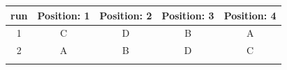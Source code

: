 \documentclass[]{book}
\theoremstyle{definition}
\theoremstyle{definition}
\theoremstyle{remark}
\begin{document}
\begin{longtable}[]{@{}ccccc@{}}
\toprule
\begin{minipage}[b]{0.07\columnwidth}\centering\strut
run\strut
\end{minipage} & \begin{minipage}[b]{0.17\columnwidth}\centering\strut
Position: 1\strut
\end{minipage} & \begin{minipage}[b]{0.17\columnwidth}\centering\strut
Position: 2\strut
\end{minipage} & \begin{minipage}[b]{0.17\columnwidth}\centering\strut
Position: 3\strut
\end{minipage} & \begin{minipage}[b]{0.17\columnwidth}\centering\strut
Position: 4\strut
\end{minipage}\tabularnewline
\midrule
\endhead
\begin{minipage}[t]{0.07\columnwidth}\centering\strut
1\strut
\end{minipage} & \begin{minipage}[t]{0.17\columnwidth}\centering\strut
C\strut
\end{minipage} & \begin{minipage}[t]{0.17\columnwidth}\centering\strut
D\strut
\end{minipage} & \begin{minipage}[t]{0.17\columnwidth}\centering\strut
B\strut
\end{minipage} & \begin{minipage}[t]{0.17\columnwidth}\centering\strut
A\strut
\end{minipage}\tabularnewline
\begin{minipage}[t]{0.07\columnwidth}\centering\strut
2\strut
\end{minipage} & \begin{minipage}[t]{0.17\columnwidth}\centering\strut
A\strut
\end{minipage} & \begin{minipage}[t]{0.17\columnwidth}\centering\strut
B\strut
\end{minipage} & \begin{minipage}[t]{0.17\columnwidth}\centering\strut
D\strut
\end{minipage} & \begin{minipage}[t]{0.17\columnwidth}\centering\strut
C\strut
\end{minipage}\tabularnewline
\begin{minipage}[t]{0.07\columnwidth}\centering\strut

\end{minipage}
\end{longtable}
\end{document}

